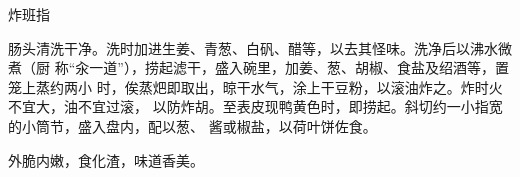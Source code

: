 \begin{recipe}{炸班指}

\ingredients


\preparation

肠头清洗干净。洗时加进生姜、青葱、白矾、醋等，以去其怪味。洗净后以沸水微煮（厨
称“汆一道”），捞起滤干，盛入碗里，加姜、葱、胡椒、食盐及绍酒等，置笼上蒸约两小
时，俟蒸𤆵即取出，晾干水气，涂上干豆粉，以滚油炸之。炸时火不宜大，油不宜过滚，
以防炸胡。至表皮现鸭黄色时，即捞起。斜切约一小指宽的小筒节，盛入盘内，配以葱、
酱或椒盐，以荷叶饼佐食。

\features

外脆内嫩，食化渣，味道香美。

\end{recipe}

